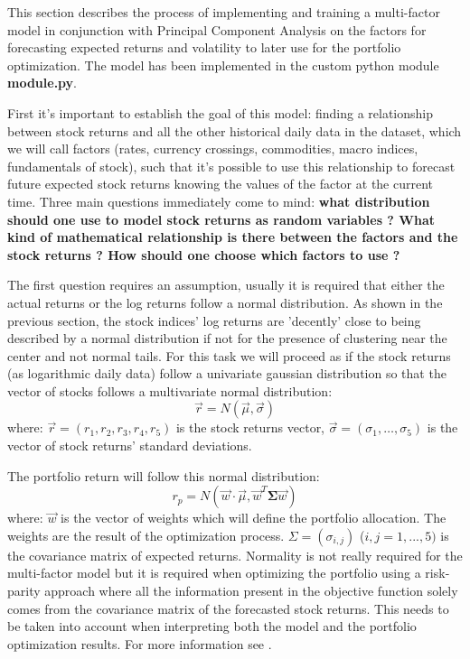 This section describes the process of implementing and training a multi-factor model in conjunction with Principal Component Analysis on the factors for forecasting expected returns and volatility to later use for the portfolio optimization. The model has been implemented in the custom python module \textbf{module.py}.

First it's important to establish the goal of this model: finding a relationship between stock returns and all the other historical daily data in the dataset, which we will call factors (rates, currency crossings, commodities, macro indices, fundamentals of stock), such that it's possible to use this relationship to forecast future expected stock returns knowing the values of the factor at the current time.
Three main questions immediately come to mind: \textbf{what distribution should one use to model stock returns as random variables ? What kind of mathematical relationship is there between the factors and the stock returns ? How should one choose which factors to use ?} 

The first question requires an assumption, usually it is required that either the actual returns or the log returns follow a normal distribution. As shown in the previous section, the stock indices' log returns are 'decently' close to being described by a normal distribution if not for the presence of clustering near the center and not normal tails. For this task we will proceed as if the stock returns (as logarithmic daily data) follow a univariate gaussian distribution so that the vector of stocks follows a multivariate normal distribution:
\begin{equation}
    \Vec{r} = N(\Vec{\mu}, \Vec{\sigma})
\end{equation}
where: $\Vec{r} = (r_1, r_2, r_3, r_4, r_5)$ is the stock returns vector, $\Vec{\sigma} = (\sigma_1, \dots, \sigma_5)$ is the vector of stock returns' standard deviations.

The  portfolio return will follow this normal  distribution:
\begin{equation}
        r_p = N(\Vec{w}\cdot\Vec{\mu}, \Vec{w}^{T}\mathbf{\Sigma}\Vec{w})
        \label{portfolio-distribution}
\end{equation}
where: $\Vec{w}$ is the vector of weights which will define the portfolio allocation. The weights are the result of the optimization process. $\Sigma = (\sigma_{i,j})$ ($i,j = 1,...,5)$ is the covariance matrix of expected returns.
Normality is not really required for the multi-factor model but it is required when optimizing the portfolio using a risk-parity approach where all the information present in the objective function solely comes from the covariance matrix of the forecasted stock returns. This needs to be taken into account when interpreting both the model and the portfolio optimization results.
For more information see \cite{eq-port-manag-book}.



